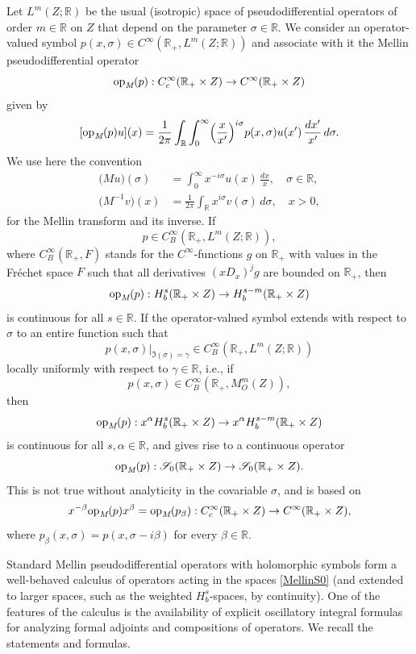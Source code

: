 \documentclass[reqno]{amsart}
\numberwithin{equation}{section}
\theoremstyle{definition}
\def\R{\mathbb R}
\def\S{\mathscr S}
\def\opm{\textup{op}_{\textit{M}}}
\begin{document}
Let $L^m(Z;\R)$ be the usual (isotropic) space of pseudodifferential operators of order $m \in \R$ on $Z$ that depend on the parameter $\sigma \in \R$. We consider an operator-valued symbol $p(x,\sigma) \in C^{\infty}(\R_+,L^m(Z;\R))$ and associate with it the Mellin pseudodifferential operator
$$
\opm(p) : C_c^{\infty}(\R_+\times Z) \to C^{\infty}(\R_+\times Z)
$$
given by
$$
[\opm(p)u](x) = \frac{1}{2\pi}\int_{\R}\int_0^{\infty}\Bigl(\frac{x}{x'}\Bigr)^{i\sigma}p(x,\sigma)u(x')\,\frac{dx'}{x'}\,d\sigma.
$$
We use here the convention
\begin{align*}
\bigr(M u\bigl)(\sigma) &= \int_0^{\infty}x^{-i\sigma}u(x)\,\frac{dx}{x}, \quad \sigma \in \R, \\
\bigr(M^{-1}v\bigl)(x) &= \frac{1}{2\pi}\int_{\R}x^{i\sigma}v(\sigma)\,d\sigma, \quad x > 0,
\end{align*}
for the Mellin transform and its inverse. If
$$
p \in C^{\infty}_B(\R_+,L^m(Z;\R)),
$$
where $C^{\infty}_B(\R_+,F)$ stands for the $C^{\infty}$-functions $g$ on $\R_+$ with values in the Fr{\'e}chet space $F$ such that all derivatives $(xD_x)^jg$ are bounded on $\R_+$, then
$$
\opm(p) : H^s_b(\R_+\times Z) \to H^{s-m}_b(\R_+\times Z)
$$
is continuous for all $s \in \R$. If the operator-valued symbol extends with respect to $\sigma$ to an entire function such that
$$
p(x,\sigma)\big|_{\Im(\sigma) = \gamma} \in C^{\infty}_B(\R_+,L^m(Z;\R))
$$
locally uniformly with respect to $\gamma \in \R$, i.e., if
$$
p(x,\sigma) \in C^{\infty}_B(\R_+,M^m_O(Z)),
$$
then
$$
\opm(p) : x^{\alpha}H^s_b(\R_+\times Z) \to x^{\alpha}H^{s-m}_b(\R_+\times Z)
$$
is continuous for all $s,\alpha \in \R$, and gives rise to a continuous operator
\begin{equation}\label{MellinS0}
\opm(p) :  \S_0(\R_+ \times Z) \to \S_0(\R_+ \times Z).
\end{equation}
This is not true without analyticity in the covariable $\sigma$, and is based on
\begin{equation}\label{conjugate}
x^{-\beta} \opm(p) x^{\beta} = \opm(p_{\beta}) : C_c^{\infty}(\R_+\times Z) \to C^{\infty}(\R_+\times Z),
\end{equation}
where $p_{\beta}(x,\sigma) = p(x,\sigma - i\beta)$ for every $\beta \in \R$.

Standard Mellin pseudodifferential operators with holomorphic symbols form a well-behaved calculus of operators acting in the spaces \eqref{MellinS0} (and extended to larger spaces, such as the weighted $H^s_b$-spaces, by continuity). One of the features of the calculus is the availability of explicit oscillatory integral formulas for analyzing formal adjoints and compositions of operators. We recall the statements and formulas.
\end{document}
